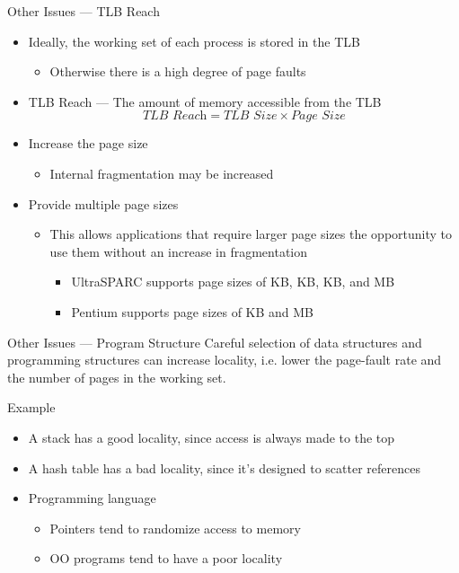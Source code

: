 \begin{frame}{Other Issues --- TLB Reach}
  \begin{itemize}
  \item Ideally, the working set of each process is stored in the TLB
    \begin{itemize}
    \item Otherwise there is a high degree of page faults
    \end{itemize}
  \item \alert{TLB Reach} --- The amount of memory accessible from the TLB
    \[\textit{TLB Reach} = \textit{TLB Size} \times \textit{Page Size}\]
  \item Increase the page size
    \begin{itemize}
    \item[] Internal fragmentation may be increased
    \end{itemize}
  \item Provide multiple page sizes
    \begin{itemize}
    \item This allows applications that require larger page sizes the opportunity to use
      them without an increase in fragmentation
      \begin{itemize}
      \item UltraSPARC supports page sizes of \unit[8]{KB}, \unit[64]{KB}, \unit[512]{KB},
        and \unit[4]{MB}
      \item Pentium supports page sizes of \unit[4]{KB} and \unit[4]{MB}
      \end{itemize}
    \end{itemize}
  \end{itemize}
\end{frame}

\begin{frame}{Other Issues --- Program Structure}
  Careful selection of data structures and programming structures can increase locality,
  i.e. lower the page-fault rate and the number of pages in the working set.
  \begin{iblock}{Example}
    \begin{itemize}
    \item A stack has a good locality, since access is always made to the top
    \item A hash table has a bad locality, since it's designed to scatter references
    \item Programming language
      \begin{itemize}
      \item Pointers tend to randomize access to memory
      \item OO programs tend to have a poor locality
      \end{itemize}
    \end{itemize}
  \end{iblock}
\end{frame}

